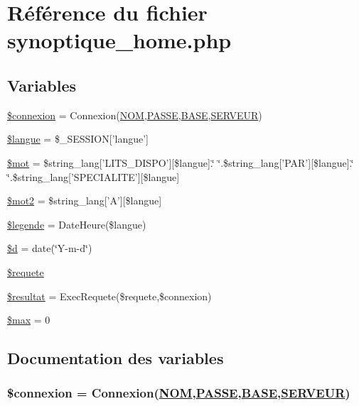 \hypertarget{synoptique__home_8php}{
\section{R\'{e}f\'{e}rence du fichier synoptique\_\-home.php}
\label{synoptique__home_8php}
}
\subsection*{Variables}
\begin{CompactItemize}
\item 
\hyperlink{synoptique__home_8php_a0}{\$connexion} = Connexion(\hyperlink{pma__connect_8php_a0}{NOM},\hyperlink{pma__connect_8php_a1}{PASSE},\hyperlink{pma__connect_8php_a3}{BASE},\hyperlink{pma__connect_8php_a2}{SERVEUR})
\item 
\hyperlink{synoptique__home_8php_a1}{\$langue} = \$\_\-SESSION\mbox{[}'langue'\mbox{]}
\item 
\hyperlink{synoptique__home_8php_a2}{\$mot} = \$string\_\-lang\mbox{[}'LITS\_\-DISPO'\mbox{]}\mbox{[}\$langue\mbox{]}.\char`\"{} \char`\"{}.\$string\_\-lang\mbox{[}'PAR'\mbox{]}\mbox{[}\$langue\mbox{]}.\char`\"{} \char`\"{}.\$string\_\-lang\mbox{[}'SPECIALITE'\mbox{]}\mbox{[}\$langue\mbox{]}
\item 
\hyperlink{synoptique__home_8php_a3}{\$mot2} = \$string\_\-lang\mbox{[}'A'\mbox{]}\mbox{[}\$langue\mbox{]}
\item 
\hyperlink{synoptique__home_8php_a4}{\$legende} = Date\-Heure(\$langue)
\item 
\hyperlink{synoptique__home_8php_a5}{\$d} = date(\char`\"{}Y-m-d\char`\"{})
\item 
\hyperlink{synoptique__home_8php_a6}{\$requete}
\item 
\hyperlink{synoptique__home_8php_a7}{\$resultat} = Exec\-Requete(\$requete,\$connexion)
\item 
\hyperlink{synoptique__home_8php_a8}{\$max} = 0
\end{CompactItemize}


\subsection{Documentation des variables}
\hypertarget{synoptique__home_8php_a0}{
\subsubsection[\$connexion]{\setlength{\rightskip}{0pt plus 5cm}\$connexion = Connexion(\hyperlink{pma__connect_8php_a0}{NOM},\hyperlink{pma__connect_8php_a1}{PASSE},\hyperlink{pma__connect_8php_a3}{BASE},\hyperlink{pma__connect_8php_a2}{SERVEUR})}}
\label{synoptique__home_8php_a0}


